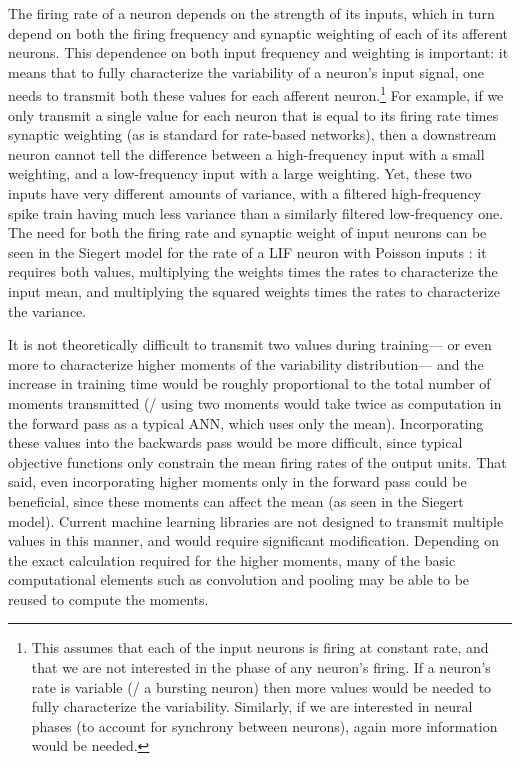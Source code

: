 The firing rate of a neuron depends on the strength of its inputs,
which in turn depend on both the firing frequency and synaptic weighting
of each of its afferent neurons.
This dependence on both input frequency and weighting is important:
it means that to fully characterize the variability of a neuron's input signal,
one needs to transmit both these values for each afferent neuron.\footnote{
  This assumes that each of the input neurons is firing at constant rate,
  and that we are not interested in the phase of any neuron's firing.
  If a neuron's rate is variable (\eg/ a bursting neuron)
  then more values would be needed to fully characterize the variability.
  Similarly, if we are interested in neural phases
  (to account for synchrony between neurons),
  again more information would be needed.}
For example, if we only transmit a single value for each neuron
that is equal to its firing rate times synaptic weighting
(as is standard for rate-based networks),
then a downstream neuron cannot tell the difference
between a high-frequency input with a small weighting,
and a low-frequency input with a large weighting.
Yet, these two inputs have very different amounts of variance,
with a filtered high-frequency spike train
having much less variance than a similarly filtered low-frequency one.
The need for both the firing rate and synaptic weight of input neurons
can be seen in the Siegert model
for the rate of a LIF neuron with Poisson inputs \parencite{OConnor2013}:
it requires both values,
multiplying the weights times the rates to characterize the input mean,
and multiplying the squared weights times the rates to characterize the variance.

It is not theoretically difficult to transmit two values during training---%
or even more to characterize higher moments of the variability distribution---%
and the increase in training time would be
roughly proportional to the total number of moments transmitted
(\eg/ using two moments would take twice as computation in the forward pass
as a typical ANN, which uses only the mean).
Incorporating these values into the backwards pass would be more difficult,
since typical objective functions only constrain the mean firing rates
of the output units.
That said, even incorporating higher moments only in the forward pass
could be beneficial,
since these moments can affect the mean
(as seen in the Siegert model).
Current machine learning libraries are not designed to transmit
multiple values in this manner,
and would require significant modification.
Depending on the exact calculation required for the higher moments,
many of the basic computational elements such as convolution and pooling
may be able to be reused to compute the moments.

